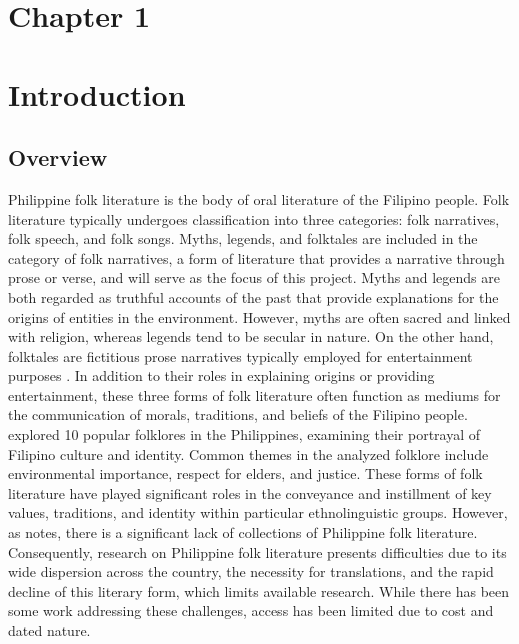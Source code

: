     \section*{Chapter 1 }
\label{sec:researchdesc}    %
\section{Introduction}
\subsection{Overview}
\label{subsec:overview}
    
    Philippine folk literature is the body of oral literature of the Filipino people. Folk literature typically undergoes classification into three categories: folk narratives, folk speech, and folk songs. Myths, legends, and folktales are included in the category of folk narratives, a form of literature that provides a narrative through prose or verse, and will serve as the focus of this project. Myths and legends are both regarded as truthful accounts of the past that provide explanations for the origins of entities in the environment. However, myths are often sacred and linked with religion, whereas legends tend to be secular in nature. On the other hand, folktales are fictitious prose narratives typically employed for entertainment purposes \cite{eugenio2007philippine}. In addition to their roles in explaining origins or providing entertainment, these three forms of folk literature often function as mediums for the communication of morals, traditions, and beliefs of the Filipino people.  explored 10 popular folklores in the Philippines, examining their portrayal of Filipino culture and identity. Common themes in the analyzed folklore include environmental importance, respect for elders, and justice. These forms of folk literature have played significant roles in the conveyance and instillment of key values, traditions, and identity within particular ethnolinguistic groups. However, as  notes, there is a significant lack of collections of Philippine folk literature. Consequently, research on Philippine folk literature presents difficulties due to its wide dispersion across the country, the necessity for translations, and the rapid decline of this literary form, which limits available research. While there has been some work addressing these challenges, access has been limited due to cost and dated nature.

